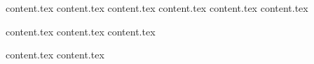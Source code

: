 \documentclass[letterpaper,11pt]{article}
\theoremstyle{mytheorem}
\begin{document}
{content.tex} \clearpage\newpage
{content.tex} \clearpage\newpage
{content.tex} \clearpage\newpage
{content.tex} \clearpage\newpage
{content.tex} \clearpage\newpage
{content.tex} \clearpage\newpage

{content.tex} \clearpage\newpage
{content.tex} \clearpage\newpage
{content.tex} \clearpage\newpage

{content.tex} \clearpage\newpage
{content.tex} \clearpage\newpage
\end{document}
